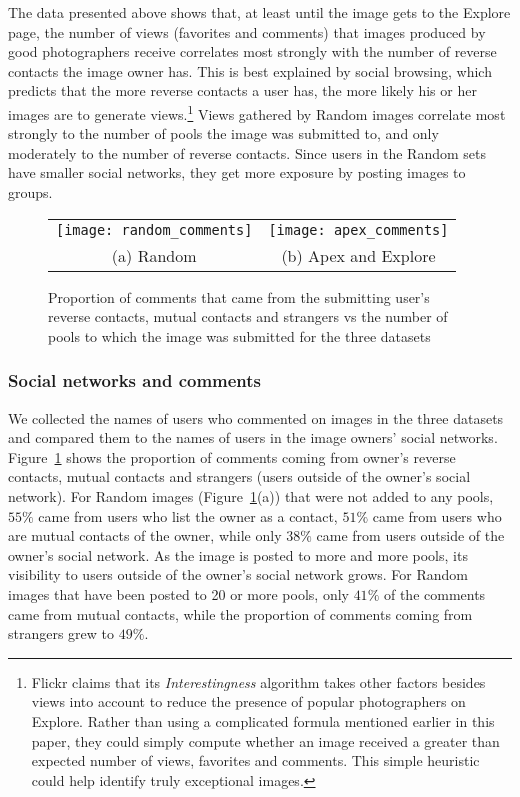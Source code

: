 \documentclass[]{article}
\newcommand{\source}[1]{\textsf{#1}}
\newcommand{\figref}[1]{Figure~\ref{#1}}
\begin{document}
The data presented above shows that, at least until the image gets
to the Explore page, the number of views (favorites and
comments) that images produced by good photographers receive correlates
most strongly with the number of reverse contacts the image owner
has. This is best explained by social browsing, which predicts that
the more reverse contacts a user has, the more likely his or her
images are to generate views.\footnote{Flickr claims that its  \emph{Interestingness} algorithm takes
other factors besides views into account to reduce the presence of
popular photographers on Explore. Rather than using a complicated
formula mentioned earlier in this paper, they could simply compute
whether an image received a greater than expected number of views,
favorites and comments. This simple heuristic could help identify truly
exceptional images.} Views gathered by \source{Random}
images correlate most strongly to the number of pools the image was
submitted to, and only moderately to the number of reverse contacts.
Since users in the \source{Random} sets have smaller social
networks, they get more exposure by posting images to groups.



\begin{figure}[tbh]
 \begin{tabular}{cc}
  \texttt{[image: random\_comments]} &

  \texttt{[image: apex\_comments]} \\
 (a) \source{Random} & (b) \source{Apex} and \source{Explore}
\end{tabular}
  \caption{Proportion of comments
that came from the submitting user's reverse contacts, mutual
contacts and strangers vs the number of pools to which the image was
submitted for the three datasets}
  \label{fig:comments}
\end{figure}


\subsubsection{Social networks and comments}
\label{sec:socnetcomments}
We collected the names of users who commented on images in the
three datasets and compared them to the names of users in the image owners' social
networks. \figref{fig:comments} shows the proportion of comments
coming from owner's reverse contacts, mutual contacts and strangers
(users outside of the owner's social network). For \source{Random} images
(\figref{fig:comments}(a)) that were not
added to any pools, $55\%$ came from users who list the owner
as a contact, $51\%$ came from users who are mutual contacts of the
owner, while only $38\%$ came from users outside of the
owner's social network. As the image is posted to more and
more pools, its visibility to users outside of the owner's
social network grows. For \source{Random} images that have been
posted to 20 or more pools, only $41\%$ of the comments came from
mutual contacts, while the proportion of comments coming from
strangers grew to $49\%$.
\end{document}
